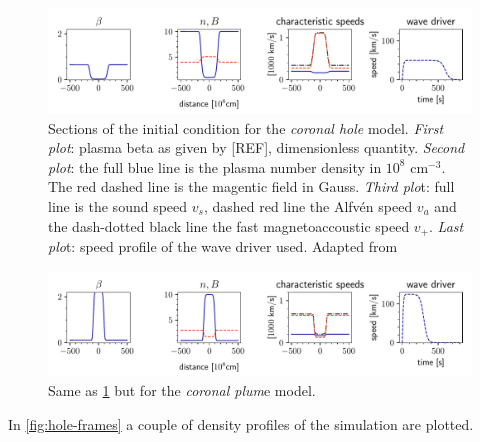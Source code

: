 \begin{figure}[H]
	\centering
	\includegraphics[width=.9\linewidth]{images/sections-initial-condition-hole.pdf}
	\caption{Sections of the initial condition for the \emph{coronal hole} model. 
		\emph{First plot}: plasma beta as given by [REF], dimensionless quantity.
		\emph{Second plot}: the full blue line is the plasma number density in $10^8$ cm$^{-3}$.
The red dashed line is the magentic field in Gauss.
\emph{Third plo}t: full line is the sound speed $v_s$, dashed red line the Alfvén speed $v_a$ and the dash-dotted black line the fast magnetoaccoustic speed $v_+$.
\emph{Last plo}t: speed profile of the wave driver used.
Adapted from \cite{coronal-hole}}
	\label{fig:hole-initial}
\end{figure}

\begin{figure}[H]
	\centering
	\includegraphics[width=.9\linewidth]{images/sections-initial-condition-plume.pdf}
	\caption{Same as \cref{fig:hole-initial} but for the \emph{coronal plum}e model.}
	\label{fig:plume-initial}
\end{figure}

In \cref{fig:hole-frames} a couple of density profiles of the simulation are plotted.

